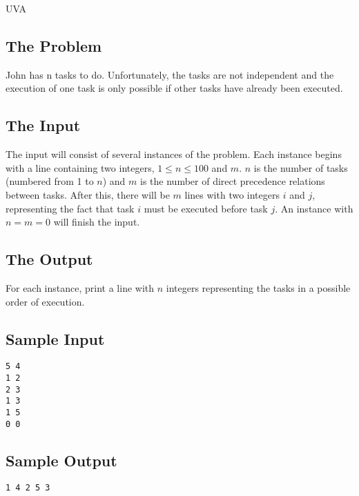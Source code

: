 

\noindent
UVA \bigskip

\subsection*{The Problem}



John has n tasks to do.
Unfortunately, the tasks are not independent and the execution of one task is only
possible if other tasks have already been executed. 


\subsection*{The Input}

The input will consist of several instances of
the problem. Each instance begins with a line containing two integers, $1\leq n\leq 100$ and $m$. $n$
is the number of tasks (numbered from 1
to $n$) and $m$ is the number of direct precedence relations between tasks. After
this, there will be $m$ lines with two
integers $i$ and $j$, representing the fact that task $i$ must be executed before task $j$.
An instance with $n = m = 0$ will
finish the input. 


\subsection*{The Output}

For each instance,
print a line with $n$ integers representing the tasks in a possible order of execution.



\subsection*{Sample Input}
\begin{verbatim}
5 4
1 2
2 3
1 3
1 5
0 0
\end{verbatim}

\subsection*{Sample Output}
\begin{verbatim}
1 4 2 5 3
\end{verbatim}

